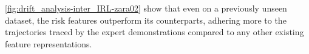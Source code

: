 \autoref{fig:drift_analysis-inter_IRL-zara02} show that even on a previously unseen dataset, the risk features outperform its counterparts, adhering more to the trajectories traced by the expert demonstrations compared to any other existing feature representations.


%
%
%

